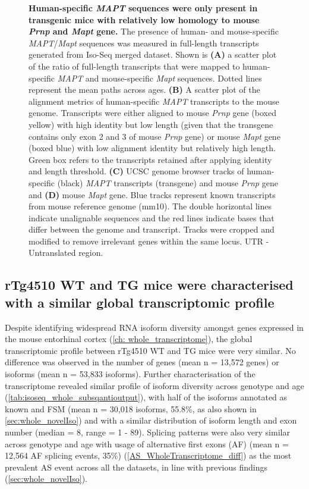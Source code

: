 \begin{figure}[htp]
	{\textbf{Human-specific \textit{MAPT} sequences were only present in transgenic mice with relatively low homology to mouse \textit{Prnp} and \textit{Mapt} gene.} The presence of human- and mouse-specific \textit{MAPT}/\textit{Mapt} sequences was measured in full-length transcripts generated from Iso-Seq merged dataset. Shown is \textbf{(A)} a scatter plot of the ratio of full-length transcripts that were mapped to human-specific \textit{MAPT} and mouse-specific \textit{Mapt} sequences. Dotted lines represent the mean paths across ages. \textbf{(B)} A scatter plot of the alignment metrics of human-specific \textit{MAPT} transcripts to the mouse genome. Transcripts were either aligned to mouse \textit{Prnp} gene (boxed yellow) with high identity but low length (given that the transgene contains only exon 2 and 3 of mouse \textit{Prnp} gene\cite{Ramsden2005}) or mouse \textit{Mapt} gene (boxed blue) with low alignment identity but relatively high length. Green box refers to the transcripts retained after applying identity and length threshold. \textbf{(C)} UCSC genome browser tracks of human-specific (black) \textit{MAPT} transcripts (transgene) and mouse \textit{Prnp} gene and \textbf{(D)} mouse \textit{Mapt} gene. Blue tracks represent known transcripts from mouse reference genome (mm10). The double horizontal lines indicate unalignable sequences and the red lines indicate bases that differ between the genome and transcript. Tracks were cropped and modified to remove irrelevant genes within the same locus. UTR - Untranslated region.}
	\label{fig:isoseq_humanmapt}
\end{figure}

\clearpage
\subsection{rTg4510 WT and TG mice were characterised with a similar global transcriptomic profile}
\label{ch4: mice_AS_events}
Despite identifying widespread RNA isoform diversity amongst genes expressed in the mouse entorhinal cortex (\cref{ch: whole_transcriptome}), the global transcriptomic profile between rTg4510 WT and TG mice were very similar. No difference was observed in the number of genes (mean n = 13,572 genes) or isoforms (mean n = 53,833 isoforms). Further characterisation of the transcriptome revealed similar profile of isoform diversity across genotype and age (\cref{tab:isoseq_whole_subsqantioutput}), with half of the isoforms annotated as known and FSM (mean n = 30,018 isoforms, 55.8\%, as also shown in \cref{sec:whole_novelIso}) and with a similar distribution of isoform length and exon number (median = 8, range = 1 - 89). Splicing patterns were also very similar across genotype and age with usage of alternative first exons (AF) (mean n = 12,564 AF splicing events, 35\%) (\cref{AS_WholeTranscriptome_diff}) as the most prevalent AS event across all the datasets, in line with previous findings (\cref{sec:whole_novelIso}).

